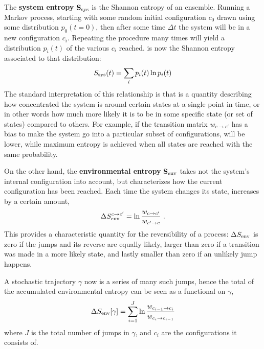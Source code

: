 The \textbf{system entropy} \(\mathbf{S_\text{sys}{}}\) is the Shannon entropy of an ensemble. Running a Markov process, starting with some random initial configuration \(c_0\) drawn using some distribution \(p_0(t=0)\), then after some time \(\Delta t\) the system will be in a new configuration \(c_i\). Repeating the procedure many times will yield a distribution \(p_i(t)\) of the various \(c_i\) reached. \SSys{} is now the Shannon entropy associated to that distribution:
%
\begin{align}
	S_\text{sys}(t) = \sum_i p_i(t)\ln p_i(t)
\end{align}
%
The standard interpretation of this relationship is that \SSys{} is a quantity describing how concentrated the system is around certain states at a single point in time, or in other words how much more likely it is to be in some specific state (or set of states) compared to others. For example, if the transition matrix \(w_{c\to c'}\) has a bias to make the system go into a particular subset of configurations, \SSys will be lower, while maximum entropy is achieved when all states are reached with the same probability.

On the other hand, the \textbf{environmental entropy} \(\mathbf{S_\text{env}{}}\) takes not the system's internal configuration into account, but characterizes how the current configuration has been reached. Each time the system changes its state, \SEnv{} increases by a certain amount,
%
\begin{align}
	\label{eqn:SEnv single jump definition}
	\Delta S_\text{env}^{c\to c'} = \ln\frac{w_{c\to c'}}{w_{c'\to c}} ~.
\end{align}
%
This provides a characteristic quantity for the reversibility of a process: \(\Delta S_\text{env}\) is zero if the jumps and its reverse are equally likely, larger than zero if a transition was made in a more likely state, and lastly smaller than zero if an unlikely jump happens.

A stochastic trajectory \(\gamma\) now is a series of many such jumps, hence the total of the accumulated environmental entropy can be seen as a functional on \(\gamma\),
%
\begin{align}
	\label{eqn:SEnv rate jump functional}
	\Delta S_\text{env}[\gamma] = \sum_{i=1}^J\ln\frac{w_{c_{i-1}\to c_i}}{w_{c_i\to c_{i-1}}}
\end{align}
%
where \(J\) is the total number of jumps in \(\gamma\), and \(c_i\) are the configurations it consists of.




